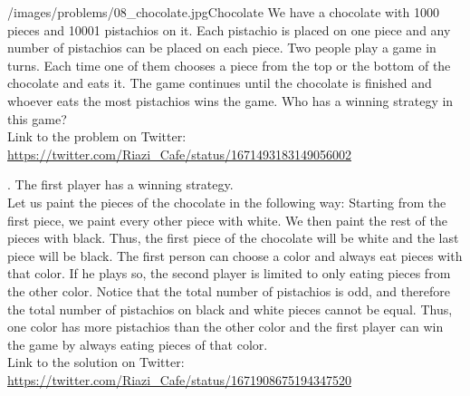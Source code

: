 \begin{problem}{/images/problems/08_chocolate.jpg}{Chocolate}
    We have a chocolate with 1000 pieces and 10001 pistachios on it. Each pistachio is placed on one piece and any number of pistachios can be placed on each piece. Two people play a game in turns. Each time one of them chooses a piece from the top or the bottom of the chocolate and eats it. The game continues until the chocolate is finished and whoever eats the most pistachios wins the game. Who has a winning strategy in this game?\\[0.2cm]

Link to the problem on Twitter:  \url{https://twitter.com/Riazi_Cafe/status/1671493183149056002}
\end{problem}
\begin{solution}.
The first player has a winning strategy. \\[0.2cm]
Let us paint the pieces of the chocolate in the following way: Starting from the first piece, we paint every other piece with white. We then paint the rest of the pieces with black. Thus, the first piece of the chocolate will be white and the last piece will be black. The first person can choose a color and always eat pieces with that color. If he plays so, the second player is limited to only eating pieces from the other color.  Notice that the total number of pistachios is odd, and therefore the total number of pistachios on black and white pieces cannot be equal. Thus, one color has more pistachios than the other color and the first player can win the game by always eating pieces of that color.\\[0.2cm]

Link to the solution on Twitter:  \url{https://twitter.com/Riazi_Cafe/status/1671908675194347520}
\end{solution}